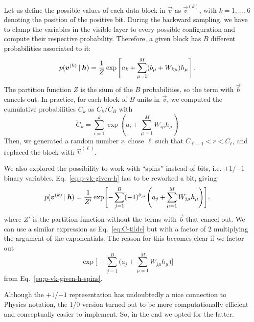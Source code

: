 \documentclass[prl, twocolumn]{revtex4-2}
\begin{document}
Let us define the possible values of each data block in $\vec{v}$ as
$\vec{v}^{(k)}$, with $k = 1, \dots, 6$ denoting the position of the
positive bit. During the backward sampling, we have to clamp the variables
in the visible layer to every possible configuration and compute their
respective probability. Therefore, a given block has $B$ different
probabilities associated to it:
\begin{equation}
    p(\bm{v}^{(k)} \:\vert\: \bm{h}) = \frac{1}{Z} \exp\left[a_k + \sum_{\mu
    = 1}^{M} (b_\mu + W_{k\mu}) h_\mu \right].
    \label{eq:p-vk-given-h}
\end{equation}
The partition function $Z$ is the sium of the $B$ probabilities, so the term
with $\vec{b}$ cancels out. In practice, for each block of $B$ units in
$\vec{v}$, we computed the cumulative probabilities $C_k$ as $\tilde{C}_k /
\tilde{C}_B$ with
\begin{equation}
    \tilde{C}_k = \sum_{i = 1}^{k} \exp\left(a_i + \sum_{\mu = 1}^{M}
    W_{i\mu} h_\mu\right)
    \label{eq:C-tilde}
\end{equation}
Then, we generated a random number $r$, chose $\ell$ such that
$C_{\ell-1}<r<C_\ell$, and replaced the block with $\vec{v}^{(\ell)}$. 

We also explored the possibility to work with “spins” instead of bits, i.e.
$+1$/$-1$ binary variables. Eq.~\eqref{eq:p-vk-given-h} has to be reworked a
bit, giving
\begin{equation}
    p(\bm{v}^{(k)} \:\vert\: \bm{h}) = \frac{1}{Z'}
    \exp\Biggl[
        - \sum_{j = 1}^{B} (-1)^{\delta_{jk}} \Biggl(a_j + \sum_{\mu =
        1}^{M} W_{j\mu} h_\mu\Biggr)
    \Biggr],
    \label{eq:p-vk-given-h-spins}
\end{equation}
where $Z'$ is the partition function without the terms with $\vec{b}$ that
cancel out. We can use a similar expression as Eq.~\eqref{eq:C-tilde} but
with a factor of $2$ multiplying the argument of the exponentials. The reason
for this becomes clear if we factor out
\begin{equation}
    \exp\Biggl[-\sum_{j = 1}^{B} \Biggl(a_j + \sum_{\mu = 1}^{M} W_{j\mu}
    h_\mu\Biggr)\Biggr]
\end{equation}
from Eq.~\eqref{eq:p-vk-given-h-spins}.

Although the $+1$/$-1$ representation has undoubtedly a nice connection to 
Physics notation, the $1$/$0$ version turned out to be more computationally 
efficient and conceptually easier to implement. So, in the end we opted for the 
latter.
\end{document}

